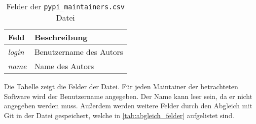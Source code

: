 \begin{table}
    \centering
    \begin{tabularx}{\textwidth}{XL{10.2cm}}
        \toprule
        \textbf{Feld} & \textbf{Beschreibung}   \\ \midrule
        \emph{login}  & Benutzername des Autors \\
        \emph{name}   & Name des Autors         \\
        \bottomrule
    \end{tabularx}
    \caption{Felder der \texttt{pypi\_maintainers.csv} Datei}
    \label{tab:pypi_maintainers}
    \small
    \raggedright
    Die Tabelle zeigt die Felder der  Datei. Für jeden Maintainer der betrachteten Software wird der Benutzername angegeben. Der Name kann leer sein, da er nicht angegeben werden muss. Außerdem werden weitere Felder durch den Abgleich mit Git in der Datei gespeichert, welche in \autoref{tab:abgleich_felder} aufgelistet sind.
\end{table}
